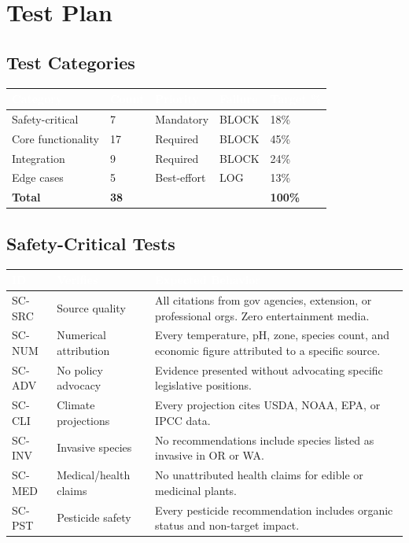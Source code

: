 \documentclass[11pt,letterpaper]{article}
\newcommand{\tableheader}[1]{\textbf{\sffamily\textcolor{white}{#1}}}
\begin{document}
\section{Test Plan}

\subsection{Test Categories}

\begin{center}
\begin{tabularx}{\textwidth}{L{3cm}C{1.5cm}C{1.5cm}C{2cm}C{2cm}}
\toprule
{}
\tableheader{Category} & \tableheader{Count} & \tableheader{Priority} & \tableheader{Failure} & \tableheader{Target \%} \\
\midrule
Safety-critical & 7 & Mandatory & BLOCK & 18\% \\
Core functionality & 17 & Required & BLOCK & 45\% \\
Integration & 9 & Required & BLOCK & 24\% \\
Edge cases & 5 & Best-effort & LOG & 13\% \\
\midrule
\textbf{Total} & \textbf{38} & & & \textbf{100\%} \\
\bottomrule
\end{tabularx}
\end{center}

\subsection{Safety-Critical Tests}

\begin{center}
\begin{tabularx}{\textwidth}{C{1.2cm}L{3.5cm}X}
\toprule
{}
\tableheader{ID} & \tableheader{Verifies} & \tableheader{Expected Behavior} \\
\midrule
SC-SRC & Source quality & All citations from gov agencies, extension, or professional orgs. Zero entertainment media. \\
SC-NUM & Numerical attribution & Every temperature, pH, zone, species count, and economic figure attributed to a specific source. \\
SC-ADV & No policy advocacy & Evidence presented without advocating specific legislative positions. \\
SC-CLI & Climate projections & Every projection cites USDA, NOAA, EPA, or IPCC data. \\
SC-INV & Invasive species & No recommendations include species listed as invasive in OR or WA. \\
SC-MED & Medical/health claims & No unattributed health claims for edible or medicinal plants. \\
SC-PST & Pesticide safety & Every pesticide recommendation includes organic status and non-target impact. \\
\bottomrule
\end{tabularx}
\end{center}
\end{document}
